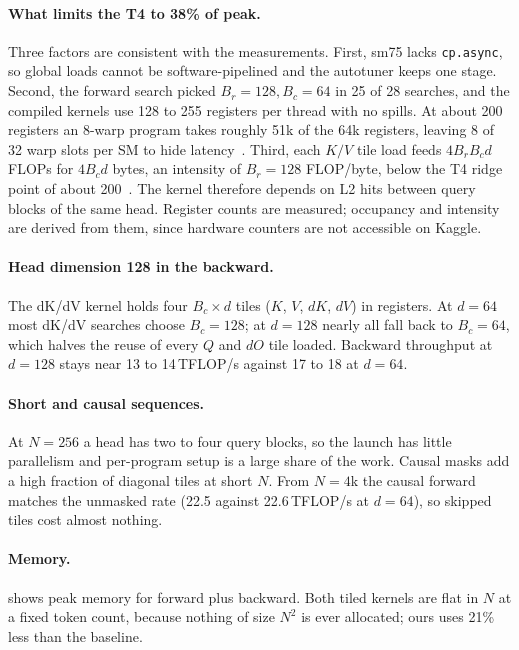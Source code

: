 \documentclass[10pt,twocolumn,letterpaper]{article}
\newcommand{\TF}{\,TFLOP/s}
\begin{document}
\paragraph{What limits the T4 to 38\% of peak.}
Three factors are consistent with the measurements. First, sm75 lacks
\texttt{cp.async}, so global loads cannot be software-pipelined and the
autotuner keeps one stage. Second, the forward search picked $B_r{=}128,
B_c{=}64$ in 25 of 28 searches, and the compiled kernels use 128 to 255
registers per thread with no spills. At about 200 registers an 8-warp program
takes roughly 51k of the 64k registers, leaving 8 of 32 warp slots per SM to
hide latency~\cite{volkov2010better}. Third, each $K/V$ tile load feeds
$4 B_r B_c d$ FLOPs for $4 B_c d$ bytes, an intensity of $B_r = 128$
FLOP/byte, below the T4 ridge point of about 200~\cite{williams2009roofline}.
The kernel therefore depends on L2 hits between query blocks of the same head.
Register counts are measured; occupancy and intensity are derived from them,
since hardware counters are not accessible on Kaggle.

\paragraph{Head dimension 128 in the backward.}
The dK/dV kernel holds four $B_c \times d$ tiles ($K$, $V$, $dK$, $dV$) in
registers. At $d = 64$ most dK/dV searches choose $B_c = 128$; at $d = 128$
nearly all fall back to $B_c = 64$, which halves the reuse of every $Q$ and
$dO$ tile loaded. Backward throughput at $d = 128$ stays near 13 to 14\TF{}
against 17 to 18 at $d = 64$.

\paragraph{Short and causal sequences.}
At $N = 256$ a head has two to four query blocks, so the launch has little
parallelism and per-program setup is a large share of the work. Causal
masks add a high fraction of diagonal tiles at short $N$. From $N = 4$k the
causal forward matches the unmasked rate (22.5 against 22.6\TF{} at $d = 64$),
so skipped tiles cost almost nothing.

\paragraph{Memory.}
 shows peak memory for forward plus backward. Both tiled
kernels are flat in $N$ at a fixed token count, because nothing of size $N^2$
is ever allocated; ours uses 21\% less than the baseline.
\end{document}
